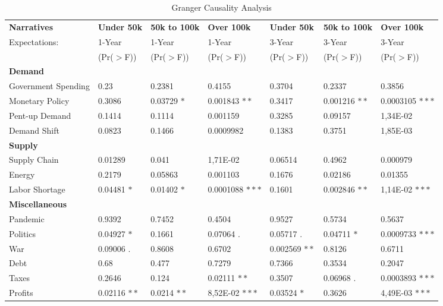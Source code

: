 
\begin{sidewaystable}[H]
	\centering
	 \tiny
	\caption{Granger Causality Analysis}\label{tab:granger_educ}
	\begin{tabular}{l|p{3cm} |p{3cm} |p{3cm} |p{3cm} |p{3cm} |p{3cm}}
		\toprule
		\textbf{Narratives} & \textbf{Under 50k} & \textbf{50k to 100k} & \textbf{Over 100k}  & \textbf{Under 50k} & \textbf{50k to 100k} & \textbf{Over 100k} \\
		 Expectations: & 1-Year & 1-Year & 1-Year & 3-Year & 3-Year & 3-Year \\
		& (Pr($>$F)) & (Pr($>$F)) & (Pr($>$F)) & (Pr($>$F)) & (Pr($>$F)) & (Pr($>$F)) \\
		\midrule
		\multicolumn{7}{l}{\textbf{Demand}} \\
		\midrule
		Government Spending & 0.23 & 0.2381 & 0.4155 & 0.3704 & 0.2337 & 0.3856 \\
		Monetary Policy     & 0.3086 & 0.03729 $\ast$ & 0.001843 $\ast\ast$ & 0.3417 & 0.001216 $\ast\ast$ &  0.0003105 $\ast\ast\ast$\\
		Pent-up Demand      & 0.1414 & 0.1114 & 0.001159 & 0.3285 & 0.09157 &  1,34E-02 \\
		Demand Shift        & 0.0823 & 0.1466 & 0.0009982 &  0.1383 & 0.3751 & 1,85E-03 \\
		\midrule
		\multicolumn{7}{l}{\textbf{Supply}} \\
		\midrule
		Supply Chain        & 0.01289 & 0.041 & 1,71E-02 &	0.06514 & 0.4962 &	0.000979 \\
		Energy              & 0.2179  & 0.05863 & 0.001103 & 0.1676 & 0.02186 & 0.01355 \\
		Labor Shortage      & 0.04481 $\ast$ & 0.01402 $\ast$ & 0.0001088 $\ast\ast\ast$ & 0.1601 & 0.002846 $\ast\ast$ & 1,14E-02 $\ast\ast\ast$ \\
		\midrule
		\multicolumn{7}{l}{\textbf{Miscellaneous}} \\
		\midrule
		Pandemic            & 0.9392  & 0.7452 & 0.4504 & 0.9527 & 0.5734 & 0.5637 \\
		Politics            & 0.04927 $\ast$  & 0.1661 & 0.07064 $.$ & 0.05717 $.$ & 0.04711 $\ast$ & 0.0009733 $\ast\ast\ast$\\
		War                 & 0.09006 $.$ & 0.8608 & 0.6702 & 0.002569 $\ast\ast$ & 0.8126 & 0.6711\\
		Debt                & 0.68  & 0.477 & 0.7279 & 0.7366 & 0.3534 & 0.2047 \\
		Taxes               & 0.2646  & 0.124 & 0.02111 $\ast\ast$ & 0.3507 & 0.06968 $.$ & 0.0003893 $\ast\ast\ast$ \\
		Profits             & 0.02116 $\ast\ast$ & 0.0214 $\ast\ast$ & 8,52E-02 $\ast\ast\ast$ & 0.03524 $\ast$ & 0.3626 & 4,49E-03 $\ast\ast\ast$ \\
		\bottomrule
	\end{tabular}
\end{sidewaystable}

